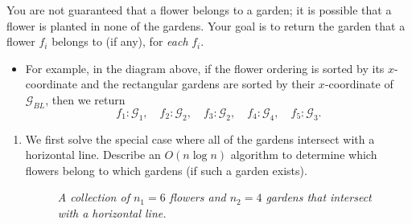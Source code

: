 \documentclass{article}
\begin{document}
\begin{question}
You are not guaranteed that a flower belongs to a garden; it is possible that a flower is planted in none of the gardens. Your goal is to return the garden that a flower $f_i$ belongs to (if any), for {\em each} $f_i$.

\begin{itemize}
    \item For example, in the diagram above, if the flower ordering is sorted by its $x$-coordinate and the rectangular gardens are sorted by their $x$-coordinate of $\mathcal G_{BL}$, then we return \[f_1: \mathcal G_1, \quad f_2: \mathcal G_2, \quad f_3: \mathcal G_2, \quad f_4: \mathcal G_4, \quad f_5: \mathcal G_3.\]
\end{itemize}

\begin{enumerate}[label = (\alph*)]
    \item We first solve the special case where all of the gardens intersect with a horizontal line. Describe an $O(n \log n)$ algorithm to determine which flowers belong to which gardens (if such a garden exists).

    \begin{figure}[H]
        \centering
        \caption{{\em A collection of $n_1 = 6$ flowers and $n_2 = 4$ gardens that intersect with a horizontal line.}}
    \end{figure}


\end{enumerate}
\end{question}
\end{document}
